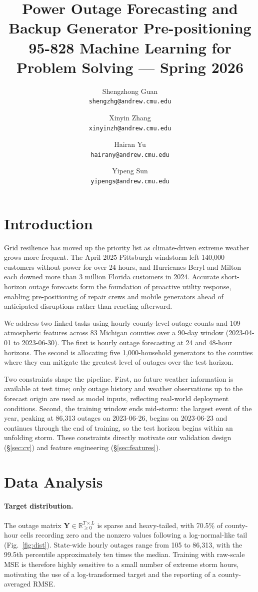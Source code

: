 \documentclass[11pt]{article}
\title{Power Outage Forecasting and Backup Generator Pre-positioning\\
\vspace{0.5em}
\Large 95-828 Machine Learning for Problem Solving --- Spring 2026}
\author{
  Shengzhong Guan \\ \texttt{shengzhg@andrew.cmu.edu}
  \and
  Xinyin Zhang \\ \texttt{xinyinzh@andrew.cmu.edu}
  \and
  Hairan Yu \\ \texttt{hairany@andrew.cmu.edu}
  \and
  Yipeng Sun \\ \texttt{yipengs@andrew.cmu.edu}
}
\date{}
\begin{document}
\maketitle

\section{Introduction}

Grid resilience has moved up the priority list as climate-driven extreme
weather grows more frequent. The April 2025 Pittsburgh windstorm left
140{,}000 customers without power for over 24 hours, and Hurricanes
Beryl and Milton each downed more than 3 million Florida customers in
2024. Accurate short-horizon outage forecasts form the foundation of proactive utility response, enabling pre-positioning of repair crews and mobile generators ahead of anticipated disruptions rather than reacting afterward.

We address two linked tasks using hourly county-level outage counts and
109 atmospheric features across 83 Michigan counties over a 90-day
window (2023-04-01 to 2023-06-30). The first is hourly outage
forecasting at 24 and 48-hour horizons. The second is allocating five
1{,}000-household generators to the counties where they can mitigate the greatest level of outages over the test horizon.

Two constraints shape the pipeline. First, no future weather information is available at test time; only outage history and weather observations up to the forecast origin are used as model inputs, reflecting real-world deployment conditions. Second, the training window ends mid-storm: the largest event of the year, peaking at 86,313 outages on 2023-06-26, begins on 2023-06-23 and continues through the end of training, so the test horizon begins within an unfolding storm. These constraints directly motivate
our validation design (\S\ref{sec:cv}) and feature engineering
(\S\ref{sec:features}).

\section{Data Analysis}
\label{sec:eda}

\paragraph{Target distribution.}
The outage matrix $\mathbf{Y}\in\mathbb{R}_{\ge 0}^{T\times L}$ is sparse and heavy-tailed, with 70.5\% of county-hour cells recording zero and the nonzero values following a log-normal-like tail (Fig.~\ref{fig:dist}). State-wide hourly outages range from 105 to 86{,}313, with the 99.5th percentile approximately ten times the median. Training with raw-scale MSE is therefore highly sensitive to a small number of extreme storm hours, motivating the use of a log-transformed target and the reporting of a county-averaged RMSE.
\end{document}
